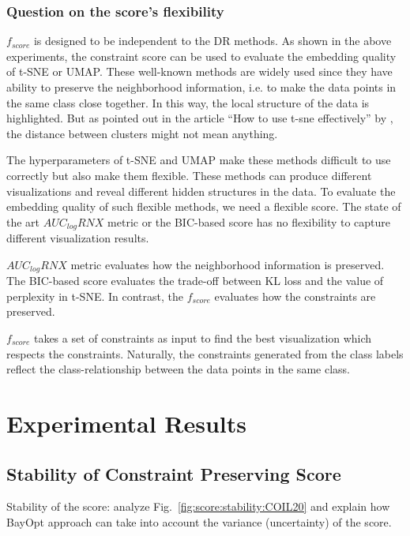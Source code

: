 \subsubsection*{Question on the score's flexibility}
$f_{score}$ is designed to be independent to the DR methods.
As shown in the above experiments, the constraint score can be used to evaluate the embedding quality of t-SNE or UMAP.
These well-known methods are widely used since they have ability to preserve the neighborhood information, i.e. to make the data points in the same class close together.
In this way, the local structure of the data is highlighted.
But as pointed out in the article ``How to use t-sne effectively'' by \citet{wattenberg2016use}, the distance between clusters might not mean anything.

The hyperparameters of t-SNE and UMAP make these methods difficult to use correctly but also make them flexible.
These methods can produce different visualizations and reveal different hidden structures in the data.
To evaluate the embedding quality of such flexible methods, we need a flexible score.
The state of the art $AUC_{log}RNX$ metric or the BIC-based score has no flexibility to capture different visualization results.

$AUC_{log}RNX$ metric evaluates how the neighborhood information is preserved.
The BIC-based score evaluates the trade-off between KL loss and the value of perplexity in t-SNE.
In contrast, the $f_{score}$ evaluates how the constraints are preserved.

$f_{score}$ takes a set of constraints as input to find the best visualization which respects the constraints.
Naturally, the constraints generated from the class labels reflect the class-relationship between the data points in the same class.


\section{Experimental Results}

\subsection{Stability of Constraint Preserving Score}

Stability of the score: analyze Fig.~\ref{fig:score:stability:COIL20} and explain how BayOpt approach can take into account the variance (uncertainty) of the score.

